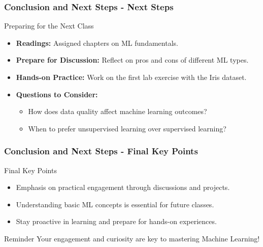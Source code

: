 \documentclass[aspectratio=169]{beamer}
\begin{document}
\begin{frame}[fragile]
  \frametitle{Conclusion and Next Steps - Next Steps}
  \begin{block}{Preparing for the Next Class}
    \begin{itemize}
      \item \textbf{Readings:} Assigned chapters on ML fundamentals.
      \item \textbf{Prepare for Discussion:} Reflect on pros and cons of different ML types.
      \item \textbf{Hands-on Practice:} Work on the first lab exercise with the Iris dataset.
      \item \textbf{Questions to Consider:}
      \begin{itemize}
        \item How does data quality affect machine learning outcomes?
        \item When to prefer unsupervised learning over supervised learning?
      \end{itemize}
    \end{itemize}
  \end{block}
\end{frame}

\begin{frame}[fragile]
  \frametitle{Conclusion and Next Steps - Final Key Points}
  \begin{block}{Final Key Points}
    \begin{itemize}
      \item Emphasis on practical engagement through discussions and projects.
      \item Understanding basic ML concepts is essential for future classes.
      \item Stay proactive in learning and prepare for hands-on experiences.
    \end{itemize}
  \end{block}
  \begin{block}{Reminder}
    Your engagement and curiosity are key to mastering Machine Learning!
  \end{block}
\end{frame}
\end{document}
